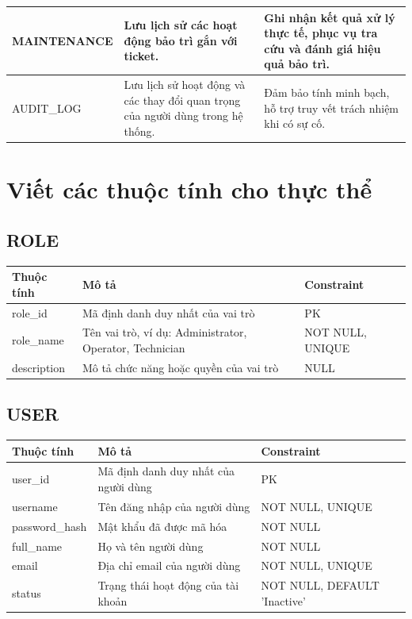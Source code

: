 \begin{center}
\begin{longtable}{|>{\raggedright\arraybackslash}p{3.5cm}|>{\raggedright\arraybackslash}p{5.5cm}|>{\raggedright\arraybackslash}p{5.5cm}|}
MAINTENANCE & Lưu lịch sử các hoạt động bảo trì gắn với ticket. & Ghi nhận kết quả xử lý thực tế, phục vụ tra cứu và đánh giá hiệu quả bảo trì. \\ \hline
AUDIT\_LOG & Lưu lịch sử hoạt động và các thay đổi quan trọng của người dùng trong hệ thống. & Đảm bảo tính minh bạch, hỗ trợ truy vết trách nhiệm khi có sự cố. \\ \hline
\end{longtable}
\end{center}

\section{Viết các thuộc tính cho thực thể}

\subsection{ROLE}
\begin{center}
\begin{longtable}{|>{\raggedright\arraybackslash}p{3.5cm}|>{\raggedright\arraybackslash}p{6.5cm}|>{\raggedright\arraybackslash}p{4.5cm}|}
\hline
\textbf{Thuộc tính} & \textbf{Mô tả} & \textbf{Constraint} \\ \hline
\endhead
role\_id & Mã định danh duy nhất của vai trò & PK \\ \hline
role\_name & Tên vai trò, ví dụ: Administrator, Operator, Technician & NOT NULL, UNIQUE \\ \hline
description & Mô tả chức năng hoặc quyền của vai trò & NULL \\ \hline
\end{longtable}
\end{center}

\subsection{USER}
\begin{center}
\begin{longtable}{|>{\raggedright\arraybackslash}p{3.5cm}|>{\raggedright\arraybackslash}p{6.5cm}|>{\raggedright\arraybackslash}p{4.5cm}|}
\hline
\textbf{Thuộc tính} & \textbf{Mô tả} & \textbf{Constraint} \\ \hline
\endhead
user\_id & Mã định danh duy nhất của người dùng & PK \\ \hline
username & Tên đăng nhập của người dùng & NOT NULL, UNIQUE \\ \hline
password\_hash & Mật khẩu đã được mã hóa & NOT NULL \\ \hline
full\_name & Họ và tên người dùng & NOT NULL \\ \hline
email & Địa chỉ email của người dùng & NOT NULL, UNIQUE \\ \hline
status & Trạng thái hoạt động của tài khoản & NOT NULL, DEFAULT 'Inactive' \\ \hline
\end{longtable}
\end{center}

